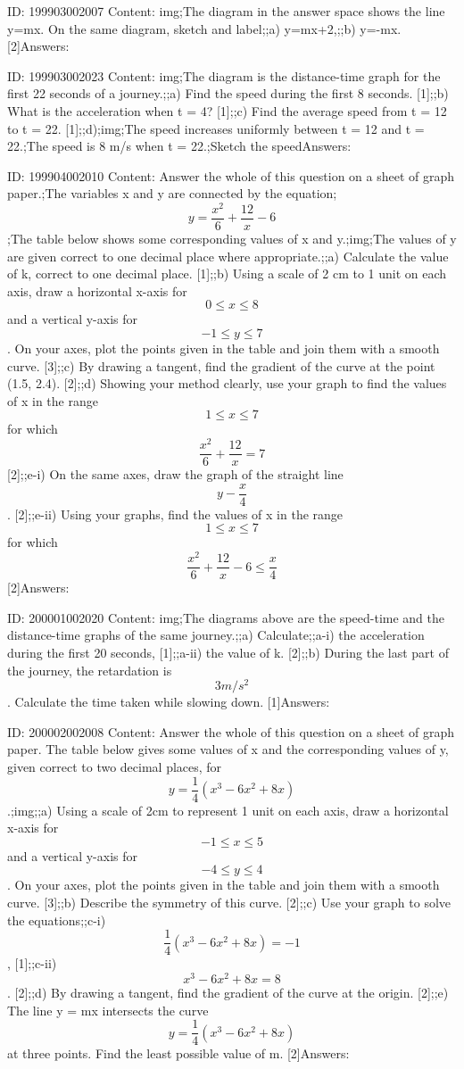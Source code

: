 \documentclass{article}
\begin{document}
ID: 199903002007
Content:
img;The diagram in the answer space shows the line y=mx. On the same diagram, sketch and label;;a) y=mx+2,;;b) y=-mx. [2]Answers:

ID: 199903002023
Content:
img;The diagram is the distance-time graph for the first 22 seconds of a journey.;;a) Find the speed during the first 8 seconds. [1];;b) What is the acceleration when t = 4? [1];;c) Find the average speed from t = 12 to t = 22. [1];;d);img;The speed increases uniformly between t = 12 and t = 22.;The speed is 8 m/s when t = 22.;Sketch the speedAnswers:

ID: 199904002010
Content:
Answer the whole of this question on a sheet of graph paper.;The variables x and y are connected by the equation;$$y = \frac{x^2}{6} + \frac{12}{x} - 6$$;The table below shows some corresponding values of x and y.;img;The values of y are given correct to one decimal place where appropriate.;;a) Calculate the value of k, correct to one decimal place. [1];;b) Using a scale of 2 cm to 1 unit on each axis, draw a horizontal x-axis for $$0 \leq x \leq 8$$  and a vertical y-axis for $$-1 \leq y \leq 7$$. On your axes, plot the points given in the table and join them with a smooth curve. [3];;c) By drawing a tangent, find the gradient of the curve at the point (1.5, 2.4). [2];;d) Showing your method clearly, use your graph to find the values of x in the range $$1 \leq x \leq 7$$ for which $$\frac{x^2}{6} + \frac{12}{x} = 7$$ [2];;e-i) On the same axes, draw the graph of the straight line $$y - \frac{x}{4}$$. [2];;e-ii) Using your graphs, find the values of x in the range $$1 \leq x \leq 7$$ for which $$\frac{x^2}{6} + \frac{12}{x} - 6 \leq \frac{x}{4}$$ [2]Answers:

ID: 200001002020
Content:
img;The diagrams above are the speed-time and the distance-time graphs of the same journey.;;a) Calculate;;a-i) the acceleration during the first 20 seconds, [1];;a-ii) the value of k. [2];;b) During the last part of the journey, the retardation is $$3m/s^{2} $$. Calculate the time taken while slowing down. [1]Answers:

ID: 200002002008
Content:
Answer the whole of this question on a sheet of graph paper. The table below gives some values of x and the corresponding values of y, given correct to two decimal places, for $$y=\frac{1}{4}(x^{3} -6x^{2} +8x)$$.;img;;a) Using a scale of 2cm to represent 1 unit on each axis, draw a horizontal x-axis for $$-1\leq x\leq5$$ and a vertical y-axis for $$-4\leq y\leq4$$. On your axes, plot the points given in the table and join them with a smooth curve. [3];;b) Describe the symmetry of this curve. [2];;c) Use your graph to solve the equations;;c-i) $$\frac{1}{4}(x^{3} -6x^{2} +8x)=-1$$, [1];;c-ii) $$x^{3} -6x^{2} +8x=8$$. [2];;d) By drawing a tangent, find the gradient of the curve at the origin. [2];;e) The line y = mx intersects the curve $$y=\frac{1}{4}(x^{3} -6x^{2} +8x)$$ at three points. Find the least possible value of m. [2]Answers:
\end{document}
